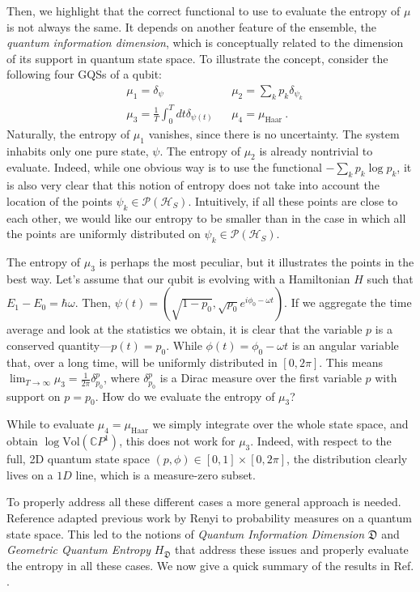 \documentclass[draft,nofootinbib,pre,twocolumn,showpacs,showkeys,groupaddress,preprintnumbers,floatfix]{revtex4-1}
\newcommand{\1}{\mathbbm{1}}
\begin{document}
Then, we highlight that the correct functional to use to evaluate the entropy of $\mu$ 
is not always the same. It depends on another feature of the ensemble, the
\emph{quantum information dimension}, which is conceptually related to the
dimension of its support in quantum state space. To illustrate the concept,
consider the following four GQSs of a qubit:
\begin{align*}
& \mu_1 = \delta_\psi && \mu_2 = \sum_{k} p_k \delta_{\psi_k} \\
& \mu_3 = \frac{1}{T}\int_0^T \!\! dt \delta_{\psi(t)} && \mu_4 = \mu_{\mathrm{Haar}}
  ~.
\end{align*}
Naturally, the entropy of $\mu_1$ vanishes, since there is no uncertainty. The
system inhabits only one pure state, $\psi$. The entropy of $\mu_2$ is already
nontrivial to evaluate. Indeed, while one obvious way is to use the functional
$-\sum_k p_k \log p_k$, it is also very clear that this notion of entropy does
not take into account the location of the points $\psi_k \in
\mathcal{P}(\mathcal{H}_S)$. Intuitively, if all these points are close to each
other, we would like our entropy to be smaller than in the case in which all
the points are uniformly distributed on $\psi_k \in \mathcal{P}(\mathcal{H}_S)$.

The entropy of $\mu_3$ is perhaps the most peculiar, but it illustrates the
points in the best way. Let's assume that our qubit is evolving with a
Hamiltonian $H$ such that $E_1 - E_0 = \hbar \omega$. Then, $\psi(t) =
(\sqrt{1-p_0},\sqrt{p_0} e^{i\phi_0 - \omega t})$. If we aggregate the
time average and look at the statistics we obtain, it is clear that the
variable $p$ is a conserved quantity---$p(t) = p_0$. While $\phi(t) = \phi_0 -
\omega t$ is an angular variable that, over a long time, will be uniformly
distributed in $[0,2\pi]$. This means $\lim_{T \to \infty}\mu_3 =
\frac{1}{2\pi}\delta^{p}_{p_0}$, where $\delta^p_{p_0}$ is a Dirac measure over
the first variable $p$ with support on $p=p_0$. How do we evaluate the
entropy of $\mu_3$?

While to evaluate $\mu_4 =\mu_{\mathrm{Haar}}$ we simply integrate over the
whole state space, and obtain $\log \mathrm{Vol}(\mathbb{C}P^1)$, this does not
work for $\mu_3$. Indeed, with respect to the full, 2D quantum state space
$(p,\phi) \in [0,1] \times [0,2\pi]$, the distribution clearly lives on a $1D$
line, which is a measure-zero subset.

To properly address all these different cases a more general approach is
needed. Reference \cite{Anza22a} adapted previous work by Renyi to probability
measures on a quantum state space. This led to the notions of \emph{Quantum
Information Dimension} $\mathfrak{D}$ and \emph{Geometric Quantum Entropy}
$H_{\mathfrak{D}}$ that address these issues and properly evaluate the entropy
in all these cases. We now give a quick summary of the results in Ref.
\cite{Anza22a}.
\end{document}

